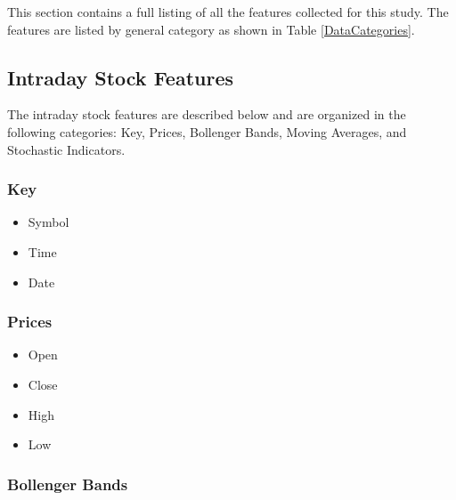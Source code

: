\documentclass[journal]{IEEEtran}
\begin{document}
This section contains a full listing of all the features collected for this
 study. The features are listed by general category as shown in 
 Table \ref{DataCategories}.

\subsection{Intraday Stock Features}

The intraday stock features are described below and are organized in the 
 following categories: Key, Prices, Bollenger Bands, Moving Averages, and Stochastic 
 Indicators.

\subsubsection{Key}

\begin{itemize}
	\item Symbol
	\item Time
	\item Date
\end{itemize}

\subsubsection{Prices}

\begin{itemize}
	\item Open
	\item Close
	\item High
	\item Low
\end{itemize}

\subsubsection{Bollenger Bands}
\end{document}
